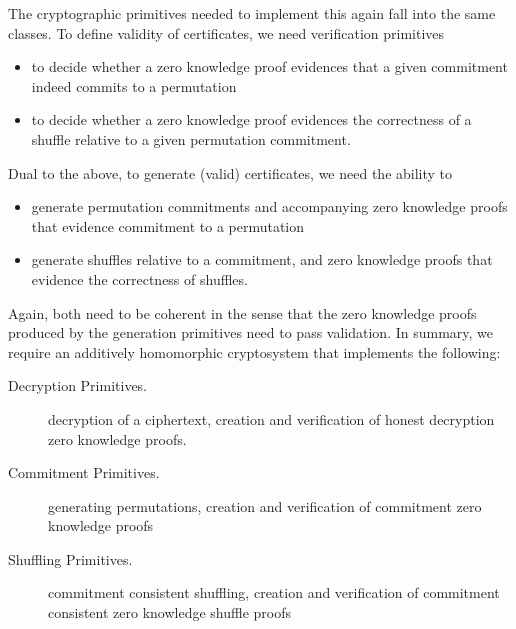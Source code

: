 \noindent
The cryptographic primitives needed to implement this again fall
into the same classes. To define validity of certificates, we need
verification primitives
\begin{itemize}
  \item to decide whether a zero knowledge proof evidences that a
  given commitment indeed commits to a permutation 
  \item to decide whether a zero knowledge proof evidences the
  correctness of a shuffle relative to a given permutation
  commitment.
\end{itemize}

\noindent
Dual to the above, to generate (valid) certificates, we need the
ability to
\begin{itemize}
  \item generate permutation commitments and accompanying zero
  knowledge proofs that evidence commitment to a permutation
  \item generate shuffles relative to a commitment, and zero
  knowledge proofs that evidence the correctness of shuffles.
\end{itemize}

\noindent
Again, both need to be coherent in the sense that the zero knowledge
proofs produced by the generation primitives need to pass
validation. In summary, we require an additively homomorphic
cryptosystem that implements the following:

\begin{description}
\item[Decryption Primitives.]
  decryption of a ciphertext, creation and verification of
 honest decryption zero knowledge proofs. 

\item[Commitment Primitives.]
  generating permutations, creation and verification of commitment
  zero knowledge proofs
\item[Shuffling Primitives.]
  commitment consistent shuffling, creation and verification of
  commitment consistent zero knowledge shuffle proofs 
\end{description}

